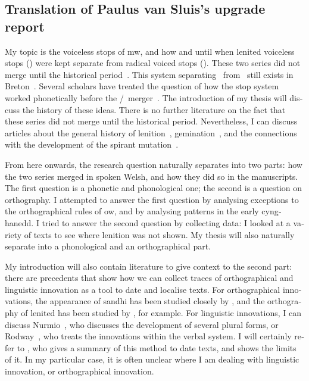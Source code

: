 \begin{english}
\chapter{Translation of Paulus van Sluis's upgrade report}
My topic is the voiceless stops of \gls{mw}, and how and until when lenited voiceless stops (\lT) were kept separate from radical voiced stops (\xD). These two series did not merge until the historical period~\autocite{koch_*cothairche_1990}. This system separating \lT\ from \xD\ still exists in Breton~\autocite{falchun_systeme_1951}. Several scholars have treated the question of how the stop system worked phonetically before the \lT/\xD\ merger~\autocite{koch_*cothairche_1990,harvey_aspects_1984,schrijver_old_2011}. The introduction of my thesis will discuss the history of these ideas. There is no further literature on the fact that these series did not merge until the historical period. Nevertheless, I can discuss articles about the general history of lenition~\autocite{martinet_celtic_1952,sims-williams_dating_1990}, gemination~\autocite{greene_gemination_1956}, and the connections with the development of the spirant mutation~\autocite{schrijver_spirantization_1999,isaac_chronology_2004}.

From here onwards, the research question naturally separates into two parts: how the two series merged in spoken Welsh, and how they did so in the manuscripts. The first question is a phonetic and phonological one; the second is a question on orthography. I attempted to answer the first question by analysing exceptions to the orthographical rules of \gls{ow}, and by analysing patterns in the early cynghanedd. I tried to answer the second question by collecting data: I looked at a variety of texts to see where lenition was not shown. My thesis will also naturally separate into a phonological and an orthographical part.

My introduction will also contain literature to give context to the second part: there are precedents that show how we can collect traces of orthographical and linguistic innovation as a tool to date and localise texts. For orthographical innovations, the appearance of sandhi  has been studied closely by \textcite{sims-williams_spread_2010}, and the orthography of lenited  has been studied by \textcite{russell_rowynniauc_2003}, for example. For linguistic innovations, I can discuss Nurmio~\autocite*{nurmio_middle_2014,nurmio_studies_????}, who discusses the development of several plural forms, or Rodway~\autocite*{rodway_datable_1998,rodway_absolute_2002,rodway_two_2003,rodway_dating_2013}, who treats the innovations within the verbal system. I will certainly refer to \textcite{rodway_where_2007}, who gives a summary of this method to date texts, and shows the limits of it. In my particular case, it is often unclear where I am dealing with linguistic innovation, or orthographical innovation.


\end{english}
